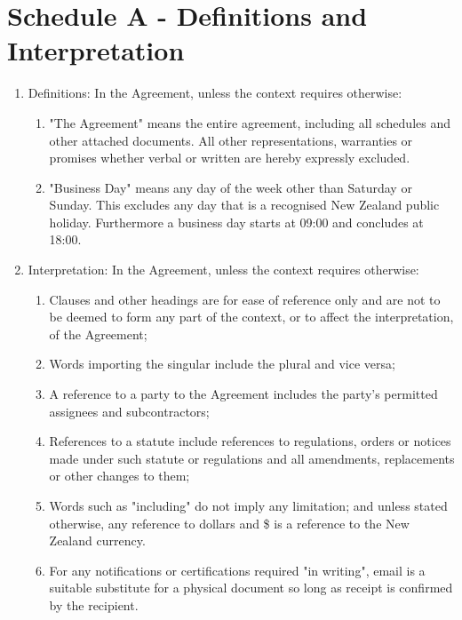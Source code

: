 \documentclass[nz-terms]{subfiles}
\begin{document}
\section{Schedule A - Definitions and Interpretation}

\begin{enumerate}
\item Definitions: In the Agreement, unless the context requires otherwise:
    \begin{enumerate}
    \item "The Agreement" means the entire agreement, including all schedules
    and other attached documents. All other representations, warranties or
    promises whether verbal or written are hereby expressly excluded.
    \item "Business Day" means any day of the week other than Saturday or
    Sunday. This excludes any day that is a recognised New Zealand public
    holiday. Furthermore a business day starts at 09:00 and concludes at
    18:00.
    \end{enumerate}
\item Interpretation: In the Agreement, unless the context requires otherwise:
    \begin{enumerate}
    \item Clauses and other headings are for ease of reference only and are not
    to be deemed to form any part of the context, or to affect the
    interpretation, of the Agreement;
    \item Words importing the singular include the plural and vice versa;
    \item A reference to a party to the Agreement includes the party's permitted
    assignees and subcontractors;
    \item References to a statute include references to regulations, orders or
    notices made under such statute or regulations and all amendments,
    replacements or other changes to them;
    \item Words such as "including" do not imply any limitation; and unless
    stated otherwise, any reference to dollars and \$ is a reference to the
    New Zealand currency.
    \item For any notifications or certifications required "in writing", email
    is a suitable substitute for a physical document so long as receipt is
    confirmed by the recipient.
    \end{enumerate}
\end{enumerate}
\end{document}
